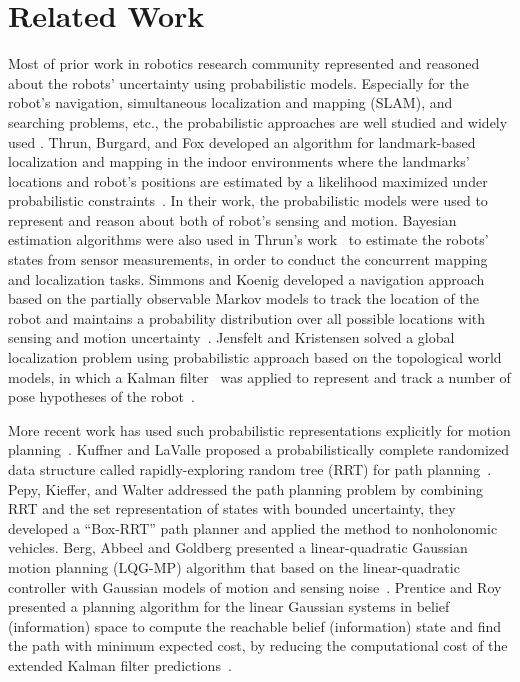 \section{Related Work}
\label{sec:related-cga}
Most of prior work in robotics research community represented and reasoned about
the robots' uncertainty using probabilistic models. Especially for the
robot's navigation, simultaneous localization and mapping (SLAM), and searching problems, etc.,
the probabilistic approaches are well studied and widely used \cite{ThrBurFox98,
  ThrBurFox00, ThrBurFox05,JenKri01,SimKoe95,ThrBee+00,
  TomYut01,KamManMin96}. Thrun, Burgard, and Fox developed an algorithm for
landmark-based localization and mapping in the indoor environments where
the landmarks' locations and robot's positions are estimated by a likelihood
maximized under probabilistic constraints~\cite{ThrBurFox98}. In their work, the
probabilistic models were used to represent and reason about both of robot's
sensing and motion. 
Bayesian estimation algorithms were also used in Thrun's
work~\cite{Thr01} to estimate the robots' states from sensor measurements,
in order to conduct the concurrent mapping and localization tasks. 
Simmons and Koenig developed a navigation approach based on the partially observable Markov models
to track the location of the robot and maintains a probability distribution over all
possible locations with sensing and motion uncertainty~\cite{SimKoe95}.
Jensfelt and Kristensen solved a global localization problem using
probabilistic approach based on the topological world models, in which a Kalman
filter~\cite{Kal60} was applied to represent and track a number of pose
hypotheses of the robot~\cite{KuiByu91}. 

More recent work has used such probabilistic representations explicitly for
motion planning~\cite{KufLav00,PepKieWal09,BerAbbGol11,PreRoy09}. 
Kuffner and LaValle proposed a probabilistically complete randomized data structure called
rapidly-exploring random tree (RRT) for path planning~\cite{KufLav00}.  
Pepy, Kieffer, and Walter addressed the path planning problem by combining RRT and the set
representation of states with bounded uncertainty, they developed a ``Box-RRT'' path
planner and applied the method to nonholonomic vehicles. 
Berg, Abbeel and Goldberg presented a linear-quadratic Gaussian motion planning (LQG-MP) algorithm that
based on the linear-quadratic controller with Gaussian models of motion and
sensing noise~\cite{BerAbbGol11}. 
Prentice and Roy presented a planning algorithm for the linear Gaussian systems in belief (information) space to compute the reachable belief (information) state and find the path with minimum
expected cost, by reducing the computational cost of the extended Kalman filter
predictions~\cite{PreRoy09}.


